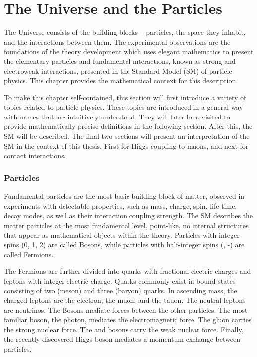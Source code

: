\section{The Universe and the Particles}

The Universe consists of the building blocks -- particles, the space they inhabit, and the interactions between them.
The experimental observations are the foundations of the theory development which uses elegant mathematics to present the elementary particles and fundamental interactions, known as strong and electroweak interactions, presented in the Standard Model (SM) of particle physics.
This chapter provides the mathematical context for this description.

To make this chapter self-contained, this section will first introduce a variety of topics related to particle physics.
These topics are introduced in a general way with names that are intuitively understood.
They will later be revisited to provide mathematically precise definitions in the following section.
After this, the SM will be described.
The final two sections will present an interpretation of the SM in the context of this thesis. First for Higgs coupling to muons, and next for contact interactions.

\subsubsection{Particles}
Fundamental particles are the most basic building block of matter, observed in experiments with detectable properties, such as mass, charge, spin, life time, decay modes, as well as their interaction coupling strength.
The SM describes the matter particles at the most fundamental level, point-like, no internal structures that appear as mathematical objects within the theory.
Particles with integer spins (0, 1, 2) are called Bosons, while particles with half-integer spins (\half, -\half) are called Fermions.

The Fermions are further divided into quarks with fractional electric charges and leptons with integer electric charge.
Quarks commonly exist in bound-states consisting of two (meson) and three (baryon) quarks.
In ascending mass, the charged leptons are the electron, the muon, and the tauon.
The neutral leptons are neutrinos.
The Bosons mediate forces between the other particles.
The most familiar boson, the photon, mediates the electromagnetic force.
The gluon carries the strong nuclear force.
The \W and \Z bosons carry the weak nuclear force.
Finally, the recently discovered Higgs boson mediates a momentum exchange between particles.

